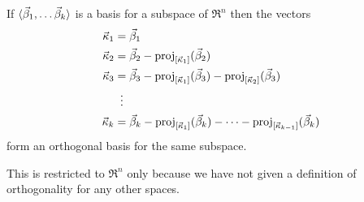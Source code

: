 \begin{theorem}
\label{th:GramSchmidt}
If \( \langle\vec{\beta}_1,\ldots\vec{\beta}_k\rangle \)
is a basis for a subspace of \( \Re^n \) then the vectors
\begin{align*}
  \vec{\kappa}_1
  &=\vec{\beta}_1    \\
  \vec{\kappa}_2
  &=\vec{\beta}_2-\proj{\vec{\beta}_2}{\spanof{\vec{\kappa}_1}}    \\
  \vec{\kappa}_3
  &=\vec{\beta}_3
  -\proj{\vec{\beta}_3}{\spanof{\vec{\kappa}_1}}
  -\proj{\vec{\beta}_3}{\spanof{\vec{\kappa}_2}}    \\
  &\vdotswithin{=}           \\
  \vec{\kappa}_k
  &=\vec{\beta}_k
  -\proj{\vec{\beta}_k}{\spanof{\vec{\kappa}_1}}-\cdots
  -\proj{\vec{\beta}_k}{\spanof{\vec{\kappa}_{k-1}}}
\end{align*}
form an orthogonal basis for the
same subspace.
\end{theorem}

\begin{remark}
This is restricted to $\Re^n$ only because we have not given a 
definition of orthogonality for any other spaces.
\end{remark}


